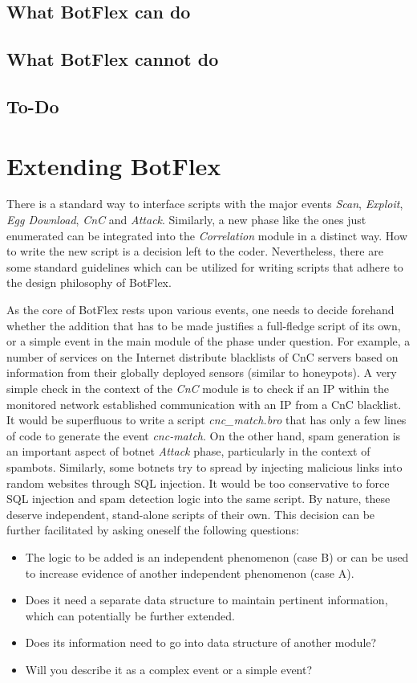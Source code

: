 \documentclass[acmtocl]{acmtrans2m}
\begin{document}
\subsection{What BotFlex can do}
\subsection{What BotFlex cannot do}
\subsection{To-Do}

\section{Extending BotFlex}
There is a standard way to interface scripts with the major events 
\textit{Scan}, \textit{Exploit}, \textit{Egg Download}, \textit{CnC} and \textit{Attack}. 
Similarly, a new phase like the ones just enumerated can be integrated
 into the \textit{Correlation} module in a distinct way. 
How to write the new script is a decision left to the coder. 
Nevertheless, there are some standard guidelines which can be utilized 
for writing scripts that adhere to the design philosophy of BotFlex.

As the core of BotFlex rests upon various events, 
one needs to decide forehand whether the addition
that has to be made justifies a full-fledge script
of its own, or a simple event in the main module of 
the phase under question. For example, a number of
services on the Internet distribute blacklists of
CnC servers based on information from their
globally deployed sensors (similar to honeypots). 
A very simple check in the context of the \textit{CnC}
module is to check if an IP within the monitored network
established communication with an IP from a CnC blacklist.
It would be superfluous to write a script \textit{cnc\_match.bro}
that has only a few lines of code to generate the event 
\textit{cnc-match}. On the other hand, spam generation is an 
important aspect of botnet \textit{Attack} phase, particularly 
in the context of spambots. Similarly, some botnets 
\cite{botnet-asprox}
 try to spread by injecting malicious links 
into random websites through SQL injection. It would be too
conservative to force SQL injection and spam detection
logic into the same script. By nature, these deserve
independent, stand-alone scripts of their own. This 
decision can be further facilitated by asking oneself 
the following questions: 
\begin{itemize}
\item The logic to be added is an independent phenomenon (case B)
or can be used to increase evidence of another independent 
phenomenon (case A).
\item Does it need a separate data structure to maintain
pertinent information, which can potentially be further extended.
\item Does its information need to go into data structure of another 
module?
\item Will you describe it as a complex event or a simple event? 
\end{itemize} 
\end{document}

